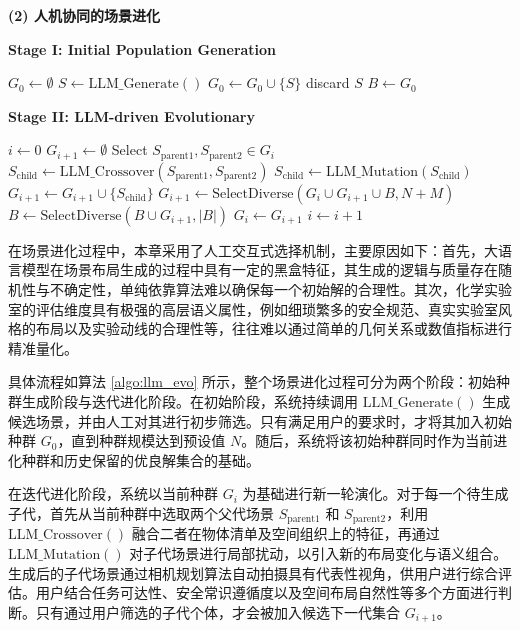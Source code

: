 \noindent\textbf{(2) 人机协同的场景进化}

\begin{algorithm}[!t]
\caption{大语言模型驱动的进化算法}
\label{algo:llm_evo}
\begin{algorithmic}[1]

    \STATE \textbf{Stage I: Initial Population Generation}

    \STATE $G_0 \gets \emptyset$
        \STATE $S \gets \text{LLM\_Generate}()$
            \STATE $G_0 \gets G_0 \cup \{S\}$
        \ELSE
            \STATE discard $S$
        \ENDIF
    \ENDWHILE
    \STATE $B \gets G_0$

    \STATE
    \STATE \textbf{Stage II: LLM-driven Evolutionary}

    \STATE $i \gets 0$
        \STATE $G_{i+1} \gets \emptyset$
            \STATE Select $S_{\text{parent1}}, S_{\text{parent2}} \in G_i$
            \STATE $S_{\text{child}} \gets \text{LLM\_Crossover}(S_{\text{parent1}}, S_{\text{parent2}})$
            \STATE $S_{\text{child}} \gets \text{LLM\_Mutation}(S_{\text{child}})$
                \STATE $G_{i+1} \gets G_{i+1} \cup \{S_{\text{child}}\}$
            \ENDIF
        \ENDWHILE
        \STATE $G_{i+1} \gets \text{SelectDiverse}(G_i \cup G_{i+1} \cup B, N+M)$
        \STATE $B \gets \text{SelectDiverse}(B \cup G_{i+1}, |B|)$
        \STATE $G_i \gets G_{i+1}$
        \STATE $i \gets i + 1$
    \ENDWHILE
\end{algorithmic}
\end{algorithm}

在场景进化过程中，本章采用了人工交互式选择机制，主要原因如下：首先，大语言模型在场景布局生成的过程中具有一定的黑盒特征，其生成的逻辑与质量存在随机性与不确定性，单纯依靠算法难以确保每一个初始解的合理性。其次，化学实验室的评估维度具有极强的高层语义属性，例如细琐繁多的安全规范、真实实验室风格的布局以及实验动线的合理性等，往往难以通过简单的几何关系或数值指标进行精准量化。

具体流程如算法 \ref{algo:llm_evo} 所示，整个场景进化过程可分为两个阶段：初始种群生成阶段与迭代进化阶段。在初始阶段，系统持续调用 $\text{LLM\_Generate}()$ 生成候选场景，并由人工对其进行初步筛选。只有满足用户的要求时，才将其加入初始种群 $G_0$，直到种群规模达到预设值 $N$。随后，系统将该初始种群同时作为当前进化种群和历史保留的优良解集合的基础。

在迭代进化阶段，系统以当前种群 $G_i$ 为基础进行新一轮演化。对于每一个待生成子代，首先从当前种群中选取两个父代场景 $S_{\text{parent1}}$ 和 $S_{\text{parent2}}$，利用 $\text{LLM\_Crossover}()$ 融合二者在物体清单及空间组织上的特征，再通过 $\text{LLM\_Mutation}()$ 对子代场景进行局部扰动，以引入新的布局变化与语义组合。生成后的子代场景通过相机规划算法自动拍摄具有代表性视角，供用户进行综合评估。用户结合任务可达性、安全常识遵循度以及空间布局自然性等多个方面进行判断。只有通过用户筛选的子代个体，才会被加入候选下一代集合 $G_{i+1}$。

